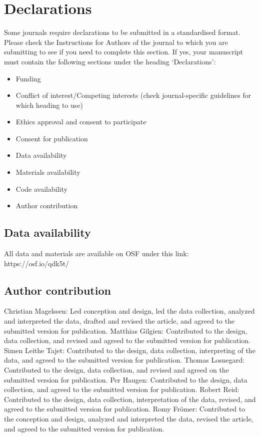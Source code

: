 \documentclass[pdflatex,sn-nature]{sn-jnl}%
\theoremstyle{thmstyleone}%
\theoremstyle{thmstyletwo}%
\theoremstyle{thmstylethree}%
\begin{document}
\section*{Declarations}

Some journals require declarations to be submitted in a standardised format. Please check the Instructions for Authors of the journal to which you are submitting to see if you need to complete this section. If yes, your manuscript must contain the following sections under the heading `Declarations':

\begin{itemize}
\item Funding
\item Conflict of interest/Competing interests (check journal-specific guidelines for which heading to use)
\item Ethics approval and consent to participate
\item Consent for publication
\item Data availability 
\item Materials availability
\item Code availability 
\item Author contribution
\end{itemize}

\subsection{Data availability}
All data and materials are available on OSF under this link: https://osf.io/qdk5t/

\subsection{Author contribution}
Christian Magelssen: Led conception and design, led the data collection, analyzed and interpreted the data, drafted and revised the article, and agreed to the submitted version for publication. Matthias Gilgien: Contributed to the design, data collection, and revised and agreed to the submitted version for publication. Simen Leithe Tajet: Contributed to the design, data collection, interpreting of the data, and agreed to the submitted version for publication. Thomas Losnegard: Contributed to the design, data collection, and revised and agreed on the submitted version for publication. Per Haugen: Contributed to the design, data collection, and agreed to the submitted version for publication. Robert Reid: Contributed to the design, data collection, interpretation of the data, revised, and agreed to the submitted version for publication. Romy Frömer: Contributed to the conception and design, analyzed and interpreted the data, revised the article, and agreed to the submitted version for publication.
\end{document}
